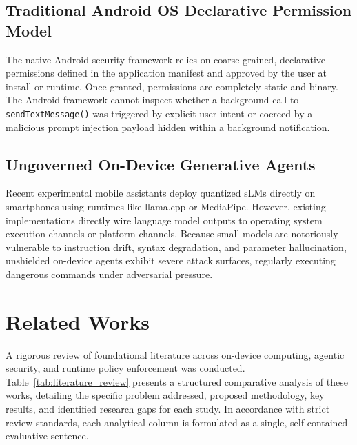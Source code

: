 \subsection{Traditional Android OS Declarative Permission Model}
The native Android security framework relies on coarse-grained, declarative permissions defined in the application manifest and approved by the user at install or runtime. Once granted, permissions are completely static and binary. The Android framework cannot inspect whether a background call to \texttt{sendTextMessage()} was triggered by explicit user intent or coerced by a malicious prompt injection payload hidden within a background notification.

\subsection{Ungoverned On-Device Generative Agents}
Recent experimental mobile assistants deploy quantized sLMs directly on smartphones using runtimes like llama.cpp or MediaPipe. However, existing implementations directly wire language model outputs to operating system execution channels or platform channels. Because small models are notoriously vulnerable to instruction drift, syntax degradation, and parameter hallucination, unshielded on-device agents exhibit severe attack surfaces, regularly executing dangerous commands under adversarial pressure.

\section{Related Works}

A rigorous review of foundational literature across on-device computing, agentic security, and runtime policy enforcement was conducted. Table~\ref{tab:literature_review} presents a structured comparative analysis of these works, detailing the specific problem addressed, proposed methodology, key results, and identified research gaps for each study. In accordance with strict review standards, each analytical column is formulated as a single, self-contained evaluative sentence.

